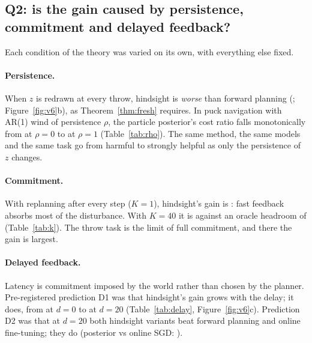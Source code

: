 \documentclass[11pt]{article}
\begin{document}
\subsection{Q2: is the gain caused by persistence, commitment and delayed feedback?}

Each condition of the theory was varied on its own, with everything else fixed.

\paragraph{Persistence.} When $z$ is redrawn at every throw, hindsight is \emph{worse} than forward planning
(\twHindFresh; Figure~\ref{fig:v6}b), as Theorem~\ref{thm:fresh} requires. In puck navigation with AR(1) wind of
persistence $\rho$, the particle posterior's cost ratio falls monotonically from \rhoZero{} at $\rho=0$ to \rhoOne{} at
$\rho=1$ (Table~\ref{tab:rho}). The same method, the same models and the same task go from harmful to strongly helpful as
only the persistence of $z$ changes.

\paragraph{Commitment.} With replanning after every step ($K=1$), hindsight's gain is \ksGainOne{}: fast feedback
absorbs most of the disturbance. With $K=40$ it is \ksGainForty{} against an oracle headroom of \ksHeadForty{}
(Table~\ref{tab:k}). The throw task is the limit of full commitment, and there the gain is largest.

\paragraph{Delayed feedback.} Latency is commitment imposed by the world rather than chosen by the planner.
Pre-registered prediction D1 was that hindsight's gain grows with the delay; it does, from \dlGainZero{} at $d=0$
to \dlGainTwenty{} at $d=20$ (Table~\ref{tab:delay}, Figure~\ref{fig:v6}c). Prediction D2 was that at $d=20$ both
hindsight variants beat forward planning and online fine-tuning; they do (posterior vs online SGD:
\dlPostVsSgdTwenty).

\begin{table}[t]\centering\small
\begin{minipage}{0.48\linewidth}\centering{}\label{tab:k}\end{minipage}\hfill
\begin{minipage}{0.48\linewidth}\centering{}\label{tab:rho}\end{minipage}
\vspace{0.6em}


\label{tab:delay}
\end{table}
\end{document}
